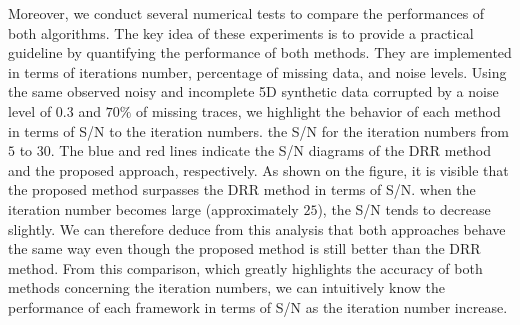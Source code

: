 Moreover, we conduct several numerical tests to compare the performances of both algorithms. The key idea of these experiments is to provide a practical guideline by quantifying the performance of both methods. They are implemented in terms of iterations number,  percentage of missing data, and noise levels. Using the same observed noisy and incomplete 5D synthetic data corrupted by a noise level of $0.3$ and $70\%$ of missing traces, we  highlight the behavior of each method in terms of S/N to the iteration numbers.  the S/N  for the iteration numbers  from $5$ to $30$. The blue and red lines indicate the S/N diagrams of the DRR method and the proposed approach, respectively. As shown on the figure, it is visible that the proposed method surpasses the DRR method in terms of S/N.  when the iteration number becomes large (approximately $25$), the S/N  tends to decrease slightly. We can therefore deduce from this analysis that both approaches behave the same way even though the proposed method is still better than the DRR method. From this comparison, which greatly highlights the accuracy of both methods concerning the iteration numbers, we can intuitively know the performance of each framework in terms of S/N as the iteration number increase. 

